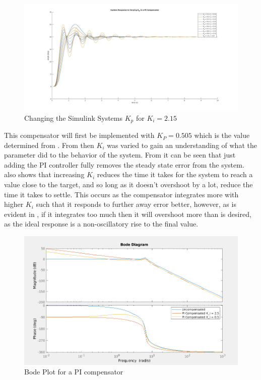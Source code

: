 \documentclass[a4paper, 11pt, compsoc]{IEEEtran}
\begin{document}
			\begin{figure}[!ht]
				\centering
				\includegraphics[width=\columnwidth]{changeK_pInPICompensator.jpg}
				\caption{Changing the Simulink Systems $K_p$ for $K_i = 2.15$}
				\label{fig:lab6PI_Kp_Change}
			\end{figure}
			This compensator will first be implemented with $K_P = 0.505$ which is the value determined from . From then $K_i$ was varied to gain an understanding of what the parameter did to the behavior of the system. From  it can be seen that just adding the PI controller fully removes the steady state error from the system.  also shows that increasing $K_i$ reduces the time it takes for the system to reach a value close to the target, and so long as it doesn't overshoot by a lot, reduce the time it takes to settle. This occurs as the compensator integrates more with higher $K_i$ such that it responds to further away error better, however, as is evident in , if it integrates too much then it will overshoot more than is desired, as the ideal response is a non-oscillatory rise to the final value. 
			\par
			\begin{figure}[!ht]
				\centering
				\includegraphics[width=\columnwidth]{PIBode.png}
				\caption{Bode Plot for a PI compensator}
				\label{fig:pibode}
			\end{figure}
\end{document}
